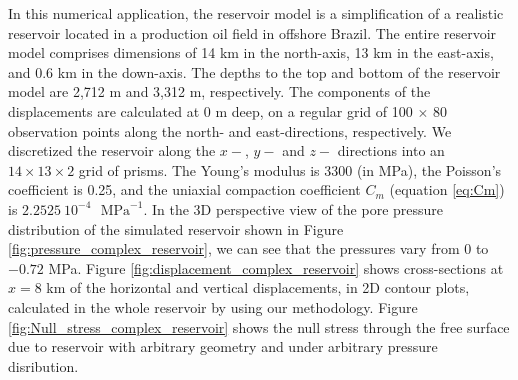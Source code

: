 \documentclass[journal abbreviation, manuscript]{copernicus}
\begin{document}
In this numerical application, the reservoir model is a simplification of a realistic reservoir located in a production oil field in offshore Brazil.
The entire reservoir model comprises dimensions of 14 km in the north-axis, 13 km in the
east-axis, and 0.6 km in the down-axis. 
The depths to the top and bottom of the reservoir model are 2,712 m and 3,312 m, respectively. 
The components of the displacements are calculated at 0 m deep, 
on a regular grid of 100 $\times$ 80  observation points along the north- and east-directions, respectively. 
We  discretized the reservoir  along the $x-$, $y-$ and $z-$ directions into an $14 \times 13 \times 2$ grid of prisms.
The Young’s modulus is  3300 (in MPa), the Poisson's coefficient is 0.25, and
the uniaxial compaction coefficient $C_{m}$  (equation \ref{eq:Cm}) is $2.2525 \: 10^{-4}$
$\textrm{ MPa}^{-1}$.
In the 3D perspective view of the pore pressure distribution of the simulated reservoir shown in Figure \ref{fig:pressure_complex_reservoir}, we can see that the pressures vary from $0$ to $-0.72$ MPa.
Figure \ref{fig:displacement_complex_reservoir} shows cross-sections at $x  = 8$ km of the horizontal and vertical displacements, in 2D contour plots, calculated in the whole reservoir by using our methodology.
Figure \ref{fig:Null_stress_complex_reservoir} shows the  null stress through the free surface 
due to reservoir with arbitrary geometry and under arbitrary pressure disribution.
\end{document}
